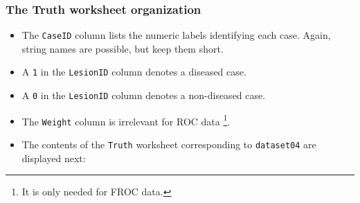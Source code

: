 \documentclass[]{book}
\providecommand{\tightlist}{%
  \setlength{\itemsep}{0pt}\setlength{\parskip}{0pt}}
\let\rmarkdownfootnote\footnote%
\def\footnote{\protect\rmarkdownfootnote}
\begin{document}
\hypertarget{the-truth-worksheet-organization-1}{%
\subsubsection{The Truth worksheet organization}\label{the-truth-worksheet-organization-1}}

\begin{itemize}
\tightlist
\item
  The \texttt{CaseID} column lists the numeric labels identifying each case. Again, string names are possible, but keep them short.
\item
  A \texttt{1} in the \texttt{LesionID} column denotes a diseased case.
\item
  A \texttt{0} in the \texttt{LesionID} column denotes a non-diseased case.
\item
  The \texttt{Weight} column is irrelevant for ROC data \footnote{It is only needed for FROC data.}.
\item
  The contents of the \texttt{Truth} worksheet corresponding to \texttt{dataset04} are displayed next:
\end{itemize}
\end{document}
